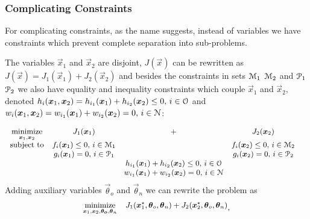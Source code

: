\documentclass[../main.tex]{subfiles}
\begin{document}
\subsubsection{Complicating Constraints}

For complicating constraints, as the name suggests, instead of variables we have constraints which prevent complete separation into sub-problems.

The variables $\vec{x}_{1}$ and $\vec{x}_{2}$ are disjoint, $J(\vec{x})$ can be rewritten as ${J(\vec{x})=J_{1}(\vec{x}_{1})+J_{2}(\vec{x}_{2})}$ and besides the constraints in sets $\set{M}_{1}$ $\set{M}_{2}$ and $\set{P}_{1}$ $\set{P}_{2}$ we also have equality and inequality constraints which couple $\vec{x}_{1}$ and $\vec{x}_{2}$, denoted ${h_{i}(\vec{x}_{1},\vec{x}_{2})=h_{i_{1}}(\vec{x}_{1})+h_{i_{2}}(\vec{x}_{2}) \leq 0\text{, }i\in\set{O}}$
and ${w_{i}(\vec{x}_{1},\vec{x}_{2})=w_{i_{1}}(\vec{x}_{1})+w_{i_{2}}(\vec{x}_{2}) =0\text{, }i\in\set{N}}$:

\begin{equation}\label{eq:general_complicating_constraints_optimization_problem}
  \small
  \begin{aligned}
    \begin{matrix}
      \underset{\vec{x}_{1},\vec{x}_{2}}{\mathrm{minimize}}  &J_{1}(\vec{x}_{1})&+&J_{2}(\vec{x}_{2})&\\
      \mathrm{subject~ to} &

           f_{i}(\vec{x}_{1}) \leq 0 \text{, } i\in\set{M}_{1}& & f_{i}(\vec{x}_{2}) \leq 0 \text{, } i\in\set{M}_{2}\\
          & g_{i}(\vec{x}_{1}) = 0\text{, } i\in\set{P}_{1}& & g_{i}(\vec{x}_{2}) = 0\text{, } i\in\set{P}_{2}\\
          && h_{i_{1}}(\vec{x}_{1})+h_{i_{2}}(\vec{x}_{2}) \leq 0\text{, } i\in\set{O}\\
          &&w_{i_{1}}(\vec{x}_{1})+w_{i_{2}}(\vec{x}_{2}) = 0\text{, }  i\in\set{N}

    \end{matrix}
  \end{aligned}
\end{equation}
Adding auxiliary variables $\vec{\theta}_{o}$ and $\vec{\theta}_{n}$ we can rewrite the problem as
\begin{equation}\label{eq:general_complicating_constraints_optimization_main_problem}
  \small
  \begin{aligned}
    \begin{matrix}
      \underset{\vec{x}_{1},\vec{x}_{2},\vec{\theta_{o}},\vec{\theta}_{n}}{\mathrm{minimize}}  &J_{1}(\vec{x}_{1}^{\star},\vec{\theta}_{o},\vec{\theta}_{n})+J_{2}(\vec{x}_{2}^{\star},\vec{\theta}_{o},\vec{\theta}_{n})
    \end{matrix}
  \end{aligned},
\end{equation}
\end{document}
